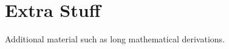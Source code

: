 \section{Extra Stuff}
\label{s:ExtraStuff}

Additional material such as long mathematical derivations.

